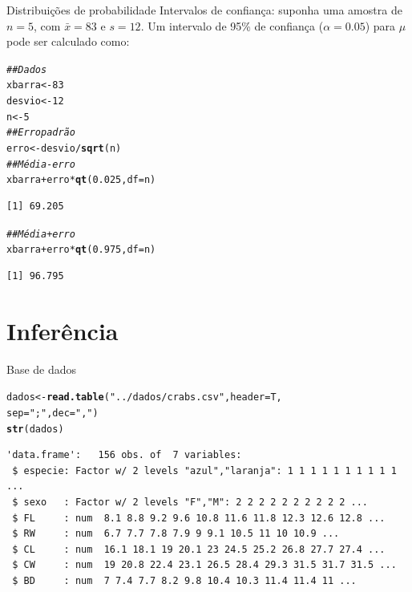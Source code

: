 \documentclass[10pt]{beamer}\usepackage[]{graphicx}\usepackage[]{color}
\makeatletter
\newcommand{\hlnum}[1]{\textcolor[rgb]{0.686,0.059,0.569}{#1}}%
\newcommand{\hlstr}[1]{\textcolor[rgb]{0.192,0.494,0.8}{#1}}%
\newcommand{\hlcom}[1]{\textcolor[rgb]{0.678,0.584,0.686}{\textit{#1}}}%
\newcommand{\hlopt}[1]{\textcolor[rgb]{0,0,0}{#1}}%
\newcommand{\hlstd}[1]{\textcolor[rgb]{0.345,0.345,0.345}{#1}}%
\newcommand{\hlkwb}[1]{\textcolor[rgb]{0.69,0.353,0.396}{#1}}%
\newcommand{\hlkwc}[1]{\textcolor[rgb]{0.333,0.667,0.333}{#1}}%
\newcommand{\hlkwd}[1]{\textcolor[rgb]{0.737,0.353,0.396}{\textbf{#1}}}%
\newenvironment{kframe}{%
 \def\at@end@of@kframe{}%
 \ifinner\ifhmode%
  \def\at@end@of@kframe{\end{minipage}}%
  \begin{minipage}{\columnwidth}%
 \fi\fi%
 \def\FrameCommand##1{\hskip\@totalleftmargin \hskip-\fboxsep
 \colorbox{shadecolor}{##1}\hskip-\fboxsep
     \hskip-\linewidth \hskip-\@totalleftmargin \hskip\columnwidth}%
 \MakeFramed {\advance\hsize-\width
   \@totalleftmargin\z@ \linewidth\hsize
   \@setminipage}}%
 {\par\unskip\endMakeFramed%
 \at@end@of@kframe}
\newenvironment{knitrout}{}{} %
\theoremstyle{definition}
\makeatother
\begin{document}
\begin{frame}[fragile=singleslide]{Distribuições de probabilidade}
Intervalos de confiança: suponha uma amostra de $n=5$, com $\bar{x}=83$
e $s=12$. Um intervalo de 95\% de confiança ($\alpha = 0.05$) para $\mu$
pode ser calculado como:
\begin{knitrout}\small
{}\color{fgcolor}\begin{kframe}
\begin{alltt}
\hlcom{## Dados}
\hlstd{xbarra} \hlkwb{<-} \hlnum{83}
\hlstd{desvio} \hlkwb{<-} \hlnum{12}
\hlstd{n} \hlkwb{<-} \hlnum{5}
\hlcom{## Erro padrão}
\hlstd{erro} \hlkwb{<-} \hlstd{desvio}\hlopt{/}\hlkwd{sqrt}\hlstd{(n)}
\hlcom{## Média - erro}
\hlstd{xbarra} \hlopt{+} \hlstd{erro} \hlopt{*} \hlkwd{qt}\hlstd{(}\hlnum{0.025}\hlstd{,} \hlkwc{df} \hlstd{= n)}
\end{alltt}
\begin{verbatim}
[1] 69.205
\end{verbatim}
\begin{alltt}
\hlcom{## Média + erro}
\hlstd{xbarra} \hlopt{+} \hlstd{erro} \hlopt{*} \hlkwd{qt}\hlstd{(}\hlnum{0.975}\hlstd{,} \hlkwc{df} \hlstd{= n)}
\end{alltt}
\begin{verbatim}
[1] 96.795
\end{verbatim}
\end{kframe}
\end{knitrout}
\end{frame}

\section{Inferência}

\begin{frame}[fragile=singleslide]{Base de dados}
\begin{knitrout}\small
{}\color{fgcolor}\begin{kframe}
\begin{alltt}
\hlstd{dados} \hlkwb{<-} \hlkwd{read.table}\hlstd{(}\hlstr{"../dados/crabs.csv"}\hlstd{,} \hlkwc{header} \hlstd{= T,}
                    \hlkwc{sep} \hlstd{=} \hlstr{";"}\hlstd{,} \hlkwc{dec} \hlstd{=} \hlstr{","}\hlstd{)}
\hlkwd{str}\hlstd{(dados)}
\end{alltt}
\begin{verbatim}
'data.frame':	156 obs. of  7 variables:
 $ especie: Factor w/ 2 levels "azul","laranja": 1 1 1 1 1 1 1 1 1 1 ...
 $ sexo   : Factor w/ 2 levels "F","M": 2 2 2 2 2 2 2 2 2 2 ...
 $ FL     : num  8.1 8.8 9.2 9.6 10.8 11.6 11.8 12.3 12.6 12.8 ...
 $ RW     : num  6.7 7.7 7.8 7.9 9 9.1 10.5 11 10 10.9 ...
 $ CL     : num  16.1 18.1 19 20.1 23 24.5 25.2 26.8 27.7 27.4 ...
 $ CW     : num  19 20.8 22.4 23.1 26.5 28.4 29.3 31.5 31.7 31.5 ...
 $ BD     : num  7 7.4 7.7 8.2 9.8 10.4 10.3 11.4 11.4 11 ...
\end{verbatim}
\end{kframe}
\end{knitrout}
\end{frame}
\end{document}
